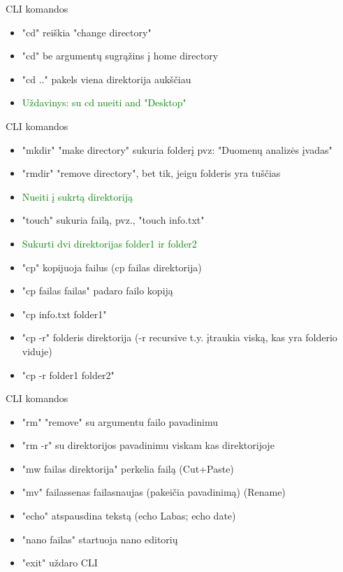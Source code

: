 \documentclass[11pt,xcolor=table]{beamer}
\begin{document}

\begin{frame}{CLI komandos}
\begin{itemize}
\item "cd"  reiškia "change directory"
\item "cd"  be argumentų sugrąžins į home directory
\item "cd .." pakels viena direktorija aukščiau
\item \textcolor{green}{Uždavinys: su cd nueiti and "Desktop"}
\end{itemize}
\end{frame}

\begin{frame}{CLI komandos}
\begin{itemize}
\item "mkdir" "make directory"  sukuria folderį pvz: "Duomenų analizės įvadas"
\item "rmdir" "remove directory", bet tik, jeigu folderis yra tuščias
\item \textcolor{green}{Nueiti į sukrtą direktoriją}
\item "touch" sukuria failą, pvz., "touch info.txt"
\item \textcolor{green}{Sukurti dvi direktorijas folder1 ir folder2}
\item "cp" kopijuoja failus (cp failas direktorija)
\item "cp failas failas" padaro failo kopiją
\item "cp info.txt folder1"
\item "cp -r" folderis direktorija (-r recursive t.y. įtraukia viską, kas yra folderio viduje)
\item "cp -r folder1 folder2"
\end{itemize}
\end{frame}

\begin{frame}{CLI komandos}
\begin{itemize}
\item "rm" "remove" su argumentu failo pavadinimu
\item "rm -r" su direktorijos pavadinimu viskam kas direktorijoje
\item "mw failas direktorija" perkelia failą (Cut+Paste)
\item "mv" failassenas failasnaujas (pakeičia pavadinimą) (Rename)
\item "echo" atspausdina tekstą (echo Labas; echo date)
\item "nano failas" startuoja nano editorių 
\item "exit" uždaro CLI 
\end{itemize}
\end{frame}
\end{document}
